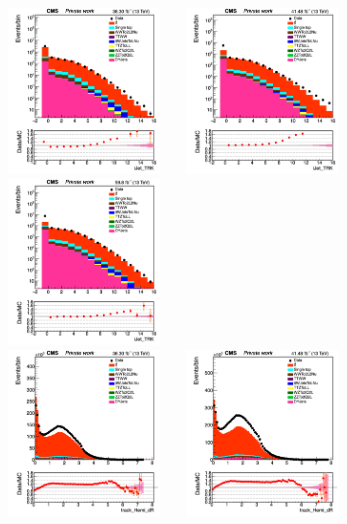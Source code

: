 \documentclass{cernatlasnote}
\begin{document}
  \begin{figure}[htp]
\centering
\includegraphics[width=4.6cm, height=4.4cm]{images/emu_channel/2016/16_Range_0pt2_1pt8/track_iJet_TRK_Log.png}
\includegraphics[width=4.6cm, height=4.4cm]{images/emu_channel/2017/17_Range_0pt2_1pt8/track_iJet_TRK_Log.png}
 \includegraphics[width=4.6cm, height=4.4cm]{images/emu_channel/2018/18_Range_0pt2_1pt8/track_iJet_TRK_Log.png}\\
 \includegraphics[width=4.6cm, height=4.4cm]{images/emu_channel/2016/16_Range_0pt2_1pt8/track_track_Hemi_dR_TRK_Linear.png}
\includegraphics[width=4.6cm, height=4.4cm]{images/emu_channel/2017/17_Range_0pt2_1pt8/track_track_Hemi_dR_TRK_Linear.png}

\end{figure}
\end{document}
